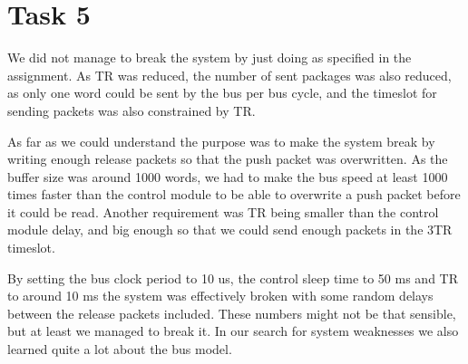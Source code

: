 \documentclass[11pt]{report}
\begin{document}
\section*{Task 5}

We did not manage to break the system by just doing as specified in the assignment.
As TR was reduced, the number of sent packages was also reduced, as only one word
could be sent by the bus per bus cycle, and the timeslot for sending packets 
was also constrained by TR.

As far as we could understand the purpose
was to make the system break by writing enough release packets so that the push
packet was overwritten. As the buffer size was around 1000 words, we had to make
the bus speed at least 1000 times faster than the control module to be able to
overwrite a push packet before it could be read. Another requirement was  
TR being smaller than the control module delay, and big enough so that we could
send enough packets in the 3TR timeslot. 

By setting the bus clock period to 10 us, the control sleep time to 50 ms and
TR to around 10 ms the system was effectively broken with some random delays between
the release packets included. These numbers might not be that sensible, but at least
we managed to break it. In our search for system weaknesses we also learned quite 
a lot about the bus model. 
\end{document}
